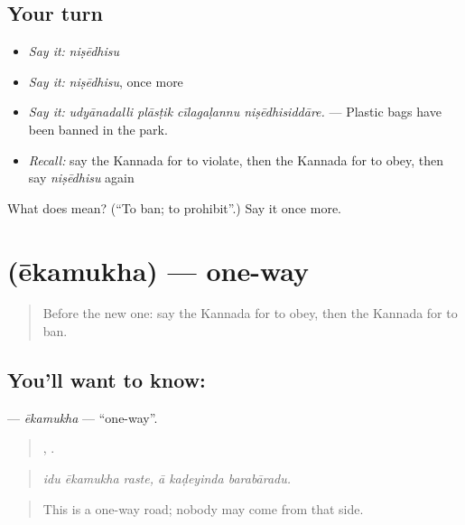 \subsection*{Your turn}
\begin{itemize}
\raggedright
  \item \emph{Say it:} \emph{niṣēdhisu}
  \item \emph{Say it:} \emph{niṣēdhisu}, once more
  \item \emph{Say it:} \emph{udyānadalli plāsṭik cīlagaḷannu niṣēdhisiddāre.} — Plastic bags have been banned in the park.
  \item \emph{Recall:} say the Kannada for to violate, then the Kannada for to obey, then say \emph{niṣēdhisu} again
\end{itemize}

\begin{tcolorbox}[breakable,colback=teal!4,colframe=teal!35!black,title={Before you move on}]
What does  mean? (\textquotedblleft{}To ban; to prohibit\textquotedblright{}.) Say it once more.
\end{tcolorbox}
\section[\texorpdfstring{\kn{ಏಕಮುಖ} (ēkamukha)}{ಏಕಮುಖ (ēkamukha)}]{ (ēkamukha) — one-way}

\label{lesson:KA-C444-ekamukha}



\begin{quote}
Before the new one: say the Kannada for to obey, then the Kannada for to ban.
\end{quote}

\subsection*{You'll want to know: }
\textbf{} — \emph{ēkamukha} — \textquotedblleft{}one-way\textquotedblright{}.

\begin{quote}
  ,   .
\end{quote}

\begin{quote}
\emph{idu ēkamukha raste, ā kaḍeyinda barabāradu.}
\end{quote}

\begin{quote}
This is a one-way road; nobody may come from that side.
\end{quote}

